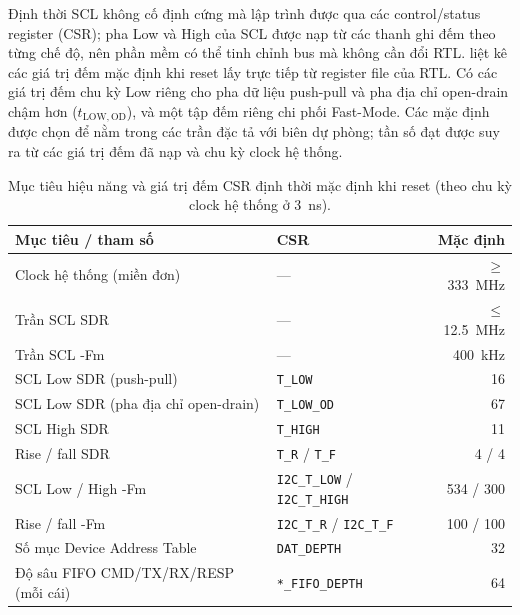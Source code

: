 Định thời SCL không cố định cứng mà lập trình được qua các control/status register (CSR); pha
Low và High của SCL được nạp từ các thanh ghi đếm theo từng chế độ, nên phần mềm có thể tinh
chỉnh bus mà không cần đổi RTL.  liệt kê các giá trị đếm mặc định khi reset
lấy trực tiếp từ register file của RTL. Có các giá trị đếm chu kỳ Low riêng cho pha dữ liệu
push-pull và pha địa chỉ open-drain chậm hơn ($t_{\mathrm{LOW,OD}}$), và một tập đếm riêng chi
phối \iic{} Fast-Mode. Các mặc định được chọn để nằm trong các trần đặc tả với biên dự phòng;
tần số đạt được suy ra từ các giá trị đếm đã nạp và chu kỳ clock hệ thống.

\begin{table}[!htb]\centering
  \caption{Mục tiêu hiệu năng và giá trị đếm CSR định thời mặc định khi reset (theo chu kỳ
  clock hệ thống ở \SI{3}{\nano\second}).}
  \label{tab:perf-targets}
  \small
  \begin{tabular}{@{}>{\raggedright\arraybackslash}p{} l r@{}}
    \toprule
    \textbf{Mục tiêu / tham số} & \textbf{CSR} & \textbf{Mặc định} \\
    \midrule
    Clock hệ thống (miền đơn)            & ---              & $\ge$\SI{333}{\mega\hertz} \\
    Trần SCL SDR                        & ---              & $\le$\SI{12.5}{\mega\hertz} \\
    Trần SCL \iic{}-Fm                  & ---              & \SI{400}{\kilo\hertz} \\
    \addlinespace
    SCL Low SDR (push-pull)             & \texttt{T\_LOW}     & 16 \\
    SCL Low SDR (pha địa chỉ open-drain)& \texttt{T\_LOW\_OD} & 67 \\
    SCL High SDR                        & \texttt{T\_HIGH}    & 11 \\
    Rise / fall SDR                     & \texttt{T\_R} / \texttt{T\_F} & 4 / 4 \\
    SCL Low / High \iic{}-Fm            & \texttt{I2C\_T\_LOW} / \texttt{I2C\_T\_HIGH} & 534 / 300 \\
    Rise / fall \iic{}-Fm               & \texttt{I2C\_T\_R} / \texttt{I2C\_T\_F} & 100 / 100 \\
    \addlinespace
    Số mục Device Address Table         & \texttt{DAT\_DEPTH}  & 32 \\
    Độ sâu FIFO CMD/TX/RX/RESP (mỗi cái) & \texttt{*\_FIFO\_DEPTH} & 64 \\
    \bottomrule
  \end{tabular}
\end{table}

